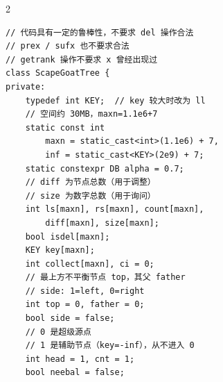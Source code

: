 \begin{multicols*}{2}
		\begin{verbatim}
// 代码具有一定的鲁棒性，不要求 del 操作合法
// prex / sufx 也不要求合法
// getrank 操作不要求 x 曾经出现过
class ScapeGoatTree {
private:
    typedef int KEY;  // key 较大时改为 ll
    // 空间约 30MB，maxn=1.1e6+7
    static const int
        maxn = static_cast<int>(1.1e6) + 7,
        inf = static_cast<KEY>(2e9) + 7;
    static constexpr DB alpha = 0.7;
    // diff 为节点总数（用于调整）
    // size 为数字总数（用于询问）
    int ls[maxn], rs[maxn], count[maxn],
        diff[maxn], size[maxn];
    bool isdel[maxn];
    KEY key[maxn];
    int collect[maxn], ci = 0;
    // 最上方不平衡节点 top，其父 father
    // side: 1=left, 0=right
    int top = 0, father = 0;
    bool side = false;
    // 0 是超级源点
    // 1 是辅助节点（key=-inf），从不进入 0
    int head = 1, cnt = 1;
    bool neebal = false;


\end{verbatim}
\end{multicols*}
